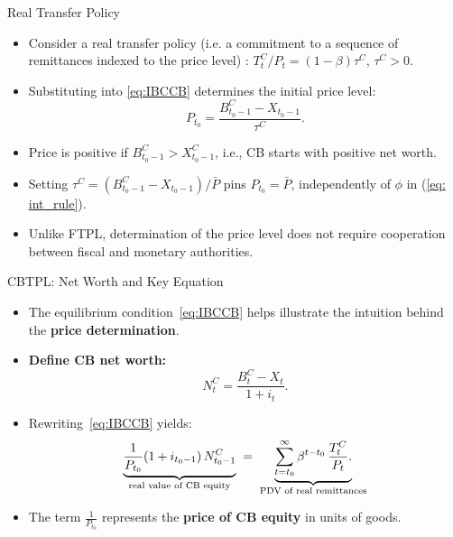 \documentclass[11pt,aspectratio=169]{beamer}
\begin{document}
\begin{frame}{Real Transfer Policy}
\begin{itemize}
    \item Consider a real transfer policy (i.e. a commitment to a sequence of remittances indexed to the price level) : $T_t^C / P_t = (1-\beta) \tau^C$, $\tau^C>0$.
    \vspace{0.25cm}
    \item Substituting into \eqref{eq:IBCCB} determines the initial price level:
    \begin{equation} \label{PdetC}
        P_{t_0} = \frac{B_{t_0-1}^C - X_{t_0-1}}{\tau^C}.
    \end{equation}
    \vspace{0.25cm}
    \item Price is positive if $B_{t_0-1}^C > X_{t_0-1}^C$, i.e., CB starts with positive net worth.
    \item Setting $\tau^C = (B_{t_0-1}^C - X_{t_0-1}) / \bar P$ pins $P_{t_0} = \bar P$, independently of $\phi$ in (\ref{eq: int_rule}).
    \vspace{0.25cm}
    \item Unlike FTPL, determination of the price level does not require cooperation between fiscal and monetary authorities.
\end{itemize}
\end{frame}

\begin{frame}{CBTPL: Net Worth and Key Equation}


\begin{itemize}
  \item The equilibrium condition~\eqref{eq:IBCCB} helps illustrate the intuition 
  behind the \textbf{price determination}.
  
  \vspace{0.25cm}
  \item \textbf{Define CB net worth:}
  \begin{equation}
  N_t^C = \frac{B_t^C - X_t}{1+i_t}.
    \label{eq: NW}
    \end{equation}
   
  
  \vspace{0.25cm}
  \item Rewriting~\eqref{eq:IBCCB} yields:
  \begin{equation}
  \underbrace{\frac{1}{P_{t_0}}(1+i_{t_0-1})\,N_{t_0-1}^C}_{\text{\scriptsize real value of CB equity}}
  \;=\;
  \underbrace{\sum_{t=t_0}^{\infty} \beta^{t-t_0}\,\frac{T_t^C}{P_t}.}_{\text{\scriptsize PDV of real remittances}}
  \label{KeyN}
  \end{equation}
  
  \vspace{0.15cm}
  \item The term $\tfrac{1}{P_{t_0}}$ represents the \textbf{price of CB equity} in units of goods.
\end{itemize}

\end{frame}
\end{document}
